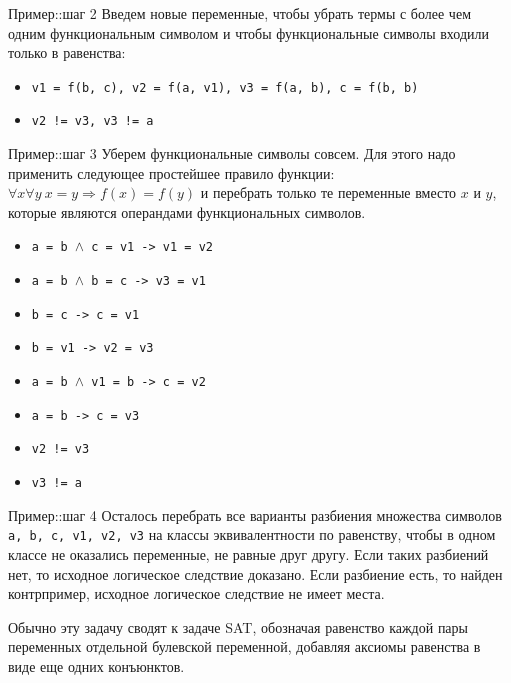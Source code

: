 \documentclass[hyperref={unicode=true}]{beamer}
\begin{document}
    \begin{frame}{Пример::шаг 2}
    Введем новые переменные, чтобы убрать термы с более чем одним
    функциональным символом и чтобы функциональные символы
    входили только в равенства:

    \begin{itemize}
    \item \texttt{v1 = f(b, c), v2 = f(a, v1),
        v3 = f(a, b), c = f(b, b)}
    \item \texttt{v2 != v3, v3 != a}
    \end{itemize}
    \end{frame}

    \begin{frame}{Пример::шаг 3}
    Уберем функциональные символы совсем. Для этого надо
    применить следующее простейшее правило функции:
    $\forall x \forall y ~ x = y \Rightarrow f(x) = f(y)$
    и перебрать только те переменные вместо $x$ и $y$,
    которые являются операндами функциональных символов.

    \begin{itemize}
    \item \texttt{a = b $\land$ c = v1 -> v1 = v2}
    \item \texttt{a = b $\land$ b = c -> v3 = v1}
    \item \texttt{b = c -> c = v1}
    \item \texttt{b = v1 -> v2 = v3}
    \item \texttt{a = b $\land$ v1 = b -> c = v2}
    \item \texttt{a = b -> c = v3}
    \item \texttt{v2 != v3}
    \item \texttt{v3 != a}
    \end{itemize}
    \end{frame}

    \begin{frame}{Пример::шаг 4}
    Осталось перебрать все варианты разбиения множества
    символов \texttt{a, b, c, v1, v2, v3} на классы
    эквивалентности по равенству, чтобы в одном классе
    не оказались переменные, не равные друг другу.
    Если таких разбиений нет, то исходное логическое
    следствие доказано. Если разбиение есть, то найден
    контрпример, исходное логическое следствие не имеет места.

    Обычно эту задачу сводят к задаче SAT, обозначая равенство
    каждой пары переменных отдельной булевской переменной,
    добавляя аксиомы равенства в виде еще одних конъюнктов.
    \end{frame}
\end{document}
